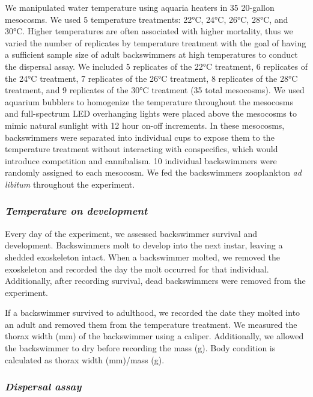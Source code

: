 \documentclass[
]{article}
\begin{document}
We manipulated water temperature using aquaria heaters in 35 20-gallon
mesocosms. We used 5 temperature treatments: 22°C, 24°C, 26°C, 28°C, and
30°C. Higher temperatures are often associated with higher mortality,
thus we varied the number of replicates by temperature treatment with
the goal of having a sufficient sample size of adult backswimmers at
high temperatures to conduct the dispersal assay. We included 5
replicates of the 22°C treatment, 6 replicates of the 24°C treatment, 7
replicates of the 26°C treatment, 8 replicates of the 28°C treatment,
and 9 replicates of the 30°C treatment (35 total mesocosms). We used
aquarium bubblers to homogenize the temperature throughout the mesocosms
and full-spectrum LED overhanging lights were placed above the mesocosms
to mimic natural sunlight with 12 hour on-off increments. In these
mesocosms, backswimmers were separated into individual cups to expose
them to the temperature treatment without interacting with conspecifics,
which would introduce competition and cannibalism. 10 individual
backswimmers were randomly assigned to each mesocosm. We fed the
backswimmers zooplankton \emph{ad libitum} throughout the experiment.

\subsubsection{\texorpdfstring{\emph{Temperature on
development}}{Temperature on development}}\label{temperature-on-development}

Every day of the experiment, we assessed backswimmer survival and
development. Backswimmers molt to develop into the next instar, leaving
a shedded exoskeleton intact. When a backswimmer molted, we removed the
exoskeleton and recorded the day the molt occurred for that individual.
Additionally, after recording survival, dead backswimmers were removed
from the experiment.

If a backswimmer survived to adulthood, we recorded the date they molted
into an adult and removed them from the temperature treatment. We
measured the thorax width (mm) of the backswimmer using a caliper.
Additionally, we allowed the backswimmer to dry before recording the
mass (g). Body condition is calculated as thorax width (mm)/mass (g).

\subsubsection{\texorpdfstring{\emph{Dispersal
assay}}{Dispersal assay}}\label{dispersal-assay}
\end{document}
